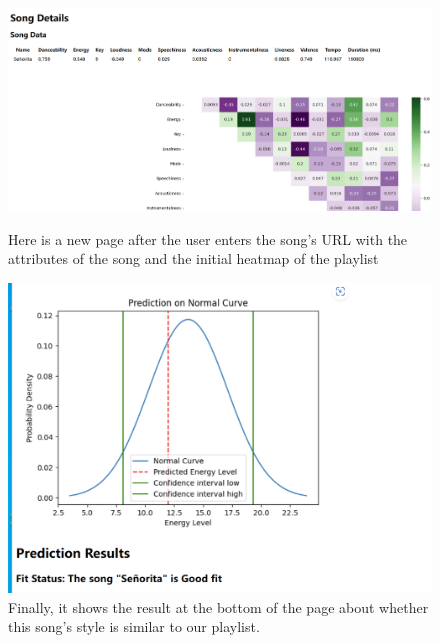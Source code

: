 \documentclass[titlepage]{article}
\begin{document}
\begin{figure}[h]
\centering
\includegraphics[width=1\textwidth]{4.png}
\caption{Here is a new page after the user enters the song's URL with the attributes of the song and the initial heatmap of the playlist}


\includegraphics[width=1\textwidth]{5.png}
\caption{Finally, it shows the result at the bottom of the page about whether this song's style is similar to our playlist.}
\label{fig:enter-label}
\end{figure}

\clearpage
\end{document}

